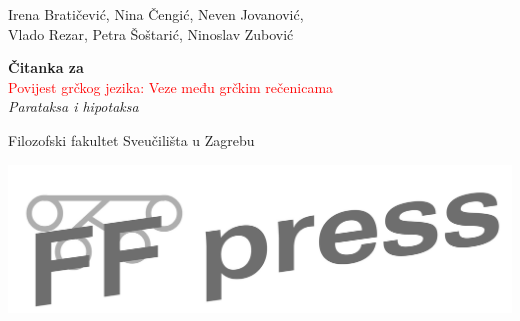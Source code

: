 \begin{titlepage} %

	\raggedleft %
	
	\vspace*{\baselineskip} %
	
	
	{\Large Irena Bratičević, Nina Čengić, Neven Jovanović,\\Vlado Rezar, Petra Šoštarić, Ninoslav Zubović} %
	
	\vspace*{0.167\textheight} %
	
	
	\textbf{\LARGE Čitanka za}\\[\baselineskip] %
	
	{\textcolor{Red}{\Huge Povijest grčkog jezika: Veze među grčkim rečenicama}}\\[\baselineskip] %
	
	{\Large \textit{Parataksa i hipotaksa}} %
	
	\vfill %
	
	
	{\large Filozofski fakultet Sveučilišta u Zagrebu
	
	\medskip
	
\includegraphics[scale=0.20]{ffpress-cb.png}} %
	
	\vspace*{3\baselineskip} %

\end{titlepage}



